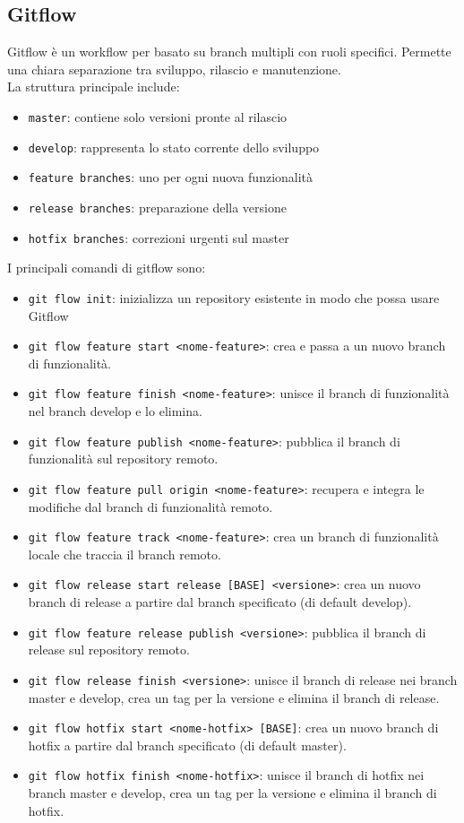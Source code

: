 \documentclass[a4paper, 11pt]{article}
\newcommand{\nocontentsline}[3]{}
\newcommand{\term}[1]{\vspace*{.5cm}\bgroup\let\addcontentsline=\nocontentsline\subsection{#1}\label{term:#1}\egroup}
\newcommand{\refterm}[1]{\nameref{term:#1}}
\begin{document}
\term{Gitflow}
Gitflow è un workflow per \refterm{Git} basato su branch multipli con ruoli specifici. Permette una chiara separazione tra sviluppo, rilascio e manutenzione.\\
La struttura principale include:
\begin{itemize}
    \item \texttt{master}: contiene solo versioni pronte al rilascio
    \item \texttt{develop}: rappresenta lo stato corrente dello sviluppo
    \item \texttt{feature branches}: uno per ogni nuova funzionalità
    \item \texttt{release branches}: preparazione della versione
    \item \texttt{hotfix branches}: correzioni urgenti sul master
\end{itemize}
I principali comandi di gitflow sono:
\begin{itemize}
  \item \texttt{git flow init}: inizializza un repository esistente in modo che possa usare Gitflow
  \item \texttt{git flow feature start <nome-feature>}: crea e passa a un nuovo branch di funzionalità.
  \item \texttt{git flow feature finish <nome-feature>}: unisce il branch di funzionalità nel branch develop e lo elimina.
  \item \texttt{git flow feature publish <nome-feature>}: pubblica il branch di funzionalità sul repository remoto.
  \item \texttt{git flow feature pull origin <nome-feature>}: recupera e integra le modifiche dal branch di funzionalità remoto.
  \item \texttt{git flow feature track <nome-feature>}: crea un branch di funzionalità locale che traccia il branch remoto.
  \item \texttt{git flow release start release [BASE] <versione>}: crea un nuovo branch di release a partire dal branch specificato (di default develop).
  \item \texttt{git flow feature release publish <versione>}: pubblica il branch di release sul repository remoto.
  \item \texttt{git flow release finish <versione>}: unisce il branch di release nei branch master e develop, crea un tag per la versione e elimina il branch di release.
  \item \texttt{git flow hotfix start <nome-hotfix> [BASE]}: crea un nuovo branch di hotfix a partire dal branch specificato (di default master).
  \item \texttt{git flow hotfix finish <nome-hotfix>}: unisce il branch di hotfix nei branch master e develop, crea un tag per la versione e elimina il branch di hotfix.
\end{itemize}
\end{document}
